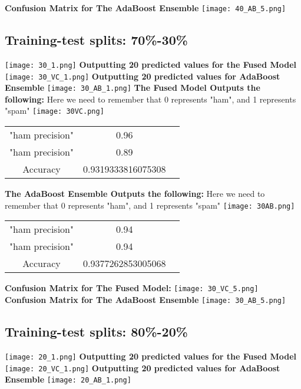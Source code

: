 \documentclass{article}
\begin{document}
\textbf{Confusion Matrix for The AdaBoost Ensemble}
\vspace{0.5cm}
\texttt{[image: 40\_AB\_5.png]}
\vspace{6cm}
\subsection{Training-test splits: 70\%-30\%}
\texttt{[image: 30\_1.png]}
\vspace{0.5cm}
\textbf{Outputting 20 predicted values for the Fused Model}
\texttt{[image: 30\_VC\_1.png]}
\vspace{0.5cm}
\textbf{Outputting 20 predicted values for AdaBoost Ensemble}
\texttt{[image: 30\_AB\_1.png]}
\textbf{The Fused Model Outputs the following: }
Here we need to remember that 0 represents "ham", and 1 represents "spam"
\texttt{[image: 30VC.png]}
\begin{center}
\begin{tabular}{ |c|c|c| } 
 \hline
 "ham precision" & 0.96  \\ 
 "ham precision" & 0.89\\ 
 Accuracy  & 0.9319333816075308 \\ 
 \hline
\end{tabular}
\end{center}
\vspace{8cm}
\textbf{The AdaBoost Ensemble Outputs the following: }
Here we need to remember that 0 represents "ham", and 1 represents "spam"
\texttt{[image: 30AB.png]}
\begin{center}
\begin{tabular}{ |c|c|c| } 
 \hline
 "ham precision" & 0.94  \\ 
 "ham precision" & 0.94 \\ 
 Accuracy  & 0.9377262853005068 \\ 
 \hline
\end{tabular}
\end{center}
\vspace{16cm}
\centering
\textbf{Confusion Matrix for The Fused Model: }
\centering
\vspace{0.5cm}
\texttt{[image: 30\_VC\_5.png]}
\centering
\vspace{0.5cm}
\textbf{Confusion Matrix for The AdaBoost Ensemble}
\centering
\vspace{0.5cm}
\texttt{[image: 30\_AB\_5.png]}

\newpage
\subsection{Training-test splits: 80\%-20\%}
\texttt{[image: 20\_1.png]}
\vspace{0.5cm}
\textbf{Outputting 20 predicted values for the Fused Model}
\texttt{[image: 20\_VC\_1.png]}
\textbf{Outputting 20 predicted values for AdaBoost Ensemble}
\texttt{[image: 20\_AB\_1.png]}
\end{document}
